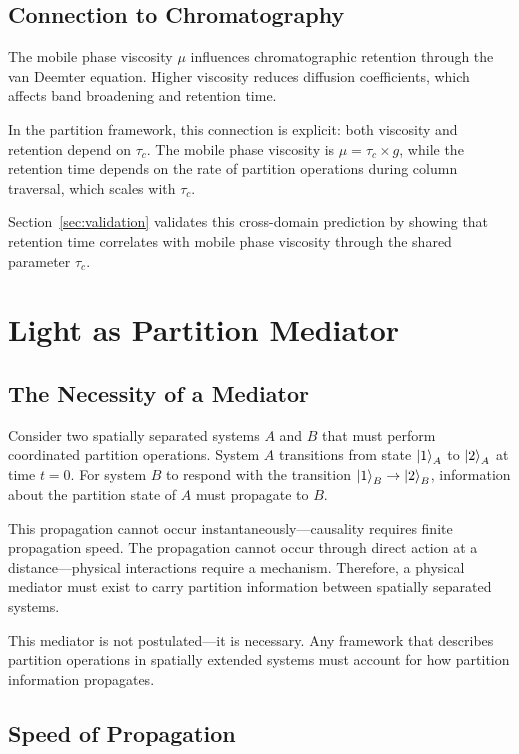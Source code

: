 \documentclass[twocolumn,superscriptaddress,prb,10pt]{revtex4-2}
\begin{document}
\subsection{Connection to Chromatography}

The mobile phase viscosity $\mu$ influences chromatographic retention through the van Deemter equation. Higher viscosity reduces diffusion coefficients, which affects band broadening and retention time.

In the partition framework, this connection is explicit: both viscosity and retention depend on $\tau_c$. The mobile phase viscosity is $\mu = \tau_c \times g$, while the retention time depends on the rate of partition operations during column traversal, which scales with $\tau_c$.

Section~\ref{sec:validation} validates this cross-domain prediction by showing that retention time correlates with mobile phase viscosity through the shared parameter $\tau_c$.

\section{Light as Partition Mediator}
\label{sec:light}

\subsection{The Necessity of a Mediator}

Consider two spatially separated systems $A$ and $B$ that must perform coordinated partition operations. System $A$ transitions from state $\ket{1}_A$ to $\ket{2}_A$ at time $t = 0$. For system $B$ to respond with the transition $\ket{1}_B \to \ket{2}_B$, information about the partition state of $A$ must propagate to $B$.

This propagation cannot occur instantaneously—causality requires finite propagation speed. The propagation cannot occur through direct action at a distance—physical interactions require a mechanism. Therefore, a physical mediator must exist to carry partition information between spatially separated systems.

This mediator is not postulated—it is necessary. Any framework that describes partition operations in spatially extended systems must account for how partition information propagates.

\subsection{Speed of Propagation}
\end{document}
